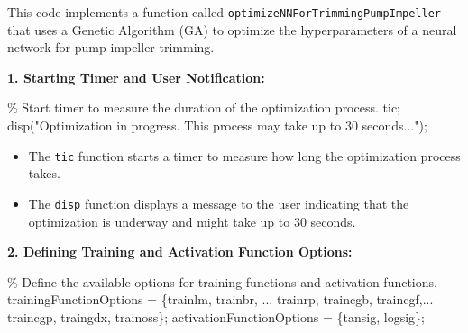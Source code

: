 \documentclass[
  super,
  review,
  3p]{elsarticle}
\newenvironment{Shaded}{\begin{snugshade}}{\end{snugshade}}
\newcommand{\CommentTok}[1]{\textcolor[rgb]{0.37,0.37,0.37}{#1}}
\newcommand{\NormalTok}[1]{\textcolor[rgb]{0.00,0.23,0.31}{#1}}
\newcommand{\OperatorTok}[1]{\textcolor[rgb]{0.37,0.37,0.37}{#1}}
\newcommand{\SpecialStringTok}[1]{\textcolor[rgb]{0.13,0.47,0.30}{#1}}
\newcommand{\StringTok}[1]{\textcolor[rgb]{0.13,0.47,0.30}{#1}}
\newcommand{\VariableTok}[1]{\textcolor[rgb]{0.07,0.07,0.07}{#1}}
\providecommand{\tightlist}{%
  \setlength{\itemsep}{0pt}\setlength{\parskip}{0pt}}\usepackage{longtable,booktabs,array}
\begin{document}
This code implements a function called
\texttt{optimizeNNForTrimmingPumpImpeller} that uses a Genetic Algorithm
(GA) to optimize the hyperparameters of a neural network for pump
impeller trimming.

\textbf{1. Starting Timer and User Notification:}

\begin{Shaded}
\begin{Highlighting}[]
    \CommentTok{\% Start timer to measure the duration of the optimization process.}
    \VariableTok{tic}\OperatorTok{;}
    \VariableTok{disp}\NormalTok{(}\StringTok{"Optimization in progress. This process may take up to 30 seconds..."}\NormalTok{)}\OperatorTok{;}
\end{Highlighting}
\end{Shaded}

\begin{itemize}
\tightlist
\item
  The \texttt{tic} function starts a timer to measure how long the
  optimization process takes.
\item
  The \texttt{disp} function displays a message to the user indicating
  that the optimization is underway and might take up to 30 seconds.
\end{itemize}

\textbf{2. Defining Training and Activation Function Options:}

\begin{Shaded}
\begin{Highlighting}[]
\CommentTok{\% Define the available options for training functions and activation functions.}
    \VariableTok{trainingFunctionOptions} \OperatorTok{=}\NormalTok{ \{}\SpecialStringTok{\textquotesingle{}trainlm\textquotesingle{}}\OperatorTok{,} \SpecialStringTok{\textquotesingle{}trainbr\textquotesingle{}}\OperatorTok{,} \OperatorTok{...}
    \SpecialStringTok{\textquotesingle{}trainrp\textquotesingle{}}\OperatorTok{,} \SpecialStringTok{\textquotesingle{}traincgb\textquotesingle{}}\OperatorTok{,} \SpecialStringTok{\textquotesingle{}traincgf\textquotesingle{}}\OperatorTok{,...}
     \SpecialStringTok{\textquotesingle{}traincgp\textquotesingle{}}\OperatorTok{,} \SpecialStringTok{\textquotesingle{}traingdx\textquotesingle{}}\OperatorTok{,} \SpecialStringTok{\textquotesingle{}trainoss\textquotesingle{}}\NormalTok{\}}\OperatorTok{;}
    \VariableTok{activationFunctionOptions} \OperatorTok{=}\NormalTok{ \{}\SpecialStringTok{\textquotesingle{}tansig\textquotesingle{}}\OperatorTok{,} \SpecialStringTok{\textquotesingle{}logsig\textquotesingle{}}\NormalTok{\}}\OperatorTok{;}
\end{Highlighting}
\end{Shaded}
\end{document}
